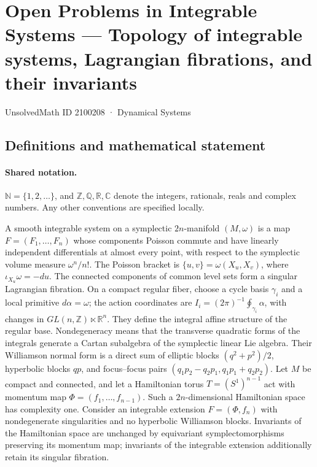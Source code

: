 \documentclass[11pt]{article}
\begin{document}
\setcounter{section}{2100207}
\section{Open Problems in Integrable Systems — Topology of integrable systems, Lagrangian fibrations, and their invariants}\label{2100208}
{\small\sffamily UnsolvedMath ID 2100208 · Dynamical Systems}
\subsection{Definitions and mathematical statement}

\paragraph{Shared notation.}$\mathbb N=\{1,2,\ldots\}$, and $\mathbb Z,\mathbb Q,\mathbb R,\mathbb C$ denote the integers, rationals, reals and complex numbers. Any other conventions are specified locally.


A smooth integrable system on a symplectic $2n$-manifold $(M,\omega)$ is a map $F=(F_1,\ldots,F_n)$ whose components Poisson commute and have linearly independent differentials at almost every point, with respect to the symplectic volume measure $\omega^n/n!$. The Poisson bracket is $\{u,v\}=\omega(X_u,X_v)$, where $\iota_{X_u}\omega=-du$. The connected components of common level sets form a singular Lagrangian fibration. On a compact regular fiber, choose a cycle basis $\gamma_i$ and a local primitive $d\alpha=\omega$; the action coordinates are $I_i=(2\pi)^{-1}\oint_{\gamma_i}\alpha$, with changes in $GL(n,\mathbb Z)\ltimes\mathbb R^n$. They define the integral affine structure of the regular base. Nondegeneracy means that the transverse quadratic forms of the integrals generate a Cartan subalgebra of the symplectic linear Lie algebra. Their Williamson normal form is a direct sum of elliptic blocks $(q^2+p^2)/2$, hyperbolic blocks $qp$, and focus--focus pairs $(q_1p_2-q_2p_1,q_1p_1+q_2p_2)$. Let $M$ be compact and connected, and let a Hamiltonian torus $T=(S^1)^{n-1}$ act with momentum map $\Phi=(f_1,\ldots,f_{n-1})$. Such a $2n$-dimensional Hamiltonian space has complexity one. Consider an integrable extension $F=(\Phi,f_n)$ with nondegenerate singularities and no hyperbolic Williamson blocks. Invariants of the Hamiltonian space are unchanged by equivariant symplectomorphisms preserving its momentum map; invariants of the integrable extension additionally retain its singular fibration.
\end{document}
